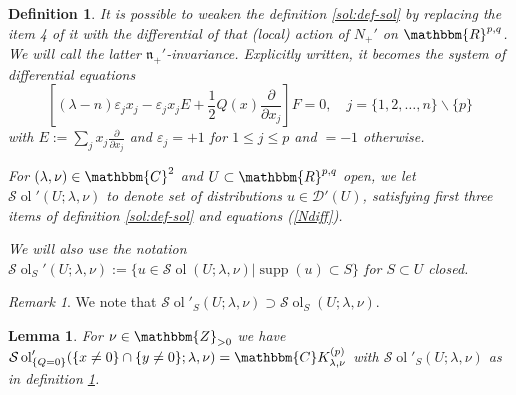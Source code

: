 \documentclass{article}
\newcommand{\assign}{:=}
\newcommand{\tmop}[1]{\ensuremath{\operatorname{#1}}}
\newtheorem{definition}[proposition]{Definition}
\newtheorem{lemma}[proposition]{Lemma}
\theoremstyle{remark}
\newtheorem{remark}[proposition]{Remark}
\begin{document}
\begin{definition}
  \label{n-nonequiv:def-solprime}It is possible to weaken the definition
  \ref{sol:def-sol} by replacing the item 4 of it with the differential of
  that (local) action of $N_+'$ on $\mathbbm{R}^{p, q}$. We will call the
  latter $\mathfrak{n}_+'$-invariance. Explicitly written, it becomes the
  system of differential equations
  \begin{equation}
    \left[ (\lambda - n) \varepsilon_j x_j - \varepsilon_j x_j E + \frac{1}{2}
    Q (x) \frac{\partial}{\partial x_j} \right] F = 0, \quad j = \{ 1, 2,
    \ldots, n \} \backslash \{ p \} \label{Ndiff}
  \end{equation}
  with $E \assign \sum_j x_j  \frac{\partial}{\partial x_j}$ and
  $\varepsilon_j = + 1$ for $1 \leq j \leq p$ and $= - 1$ otherwise.
  
  For $(\lambda, \nu) \in \mathbbm{C}^2$ and $U \subset \mathbbm{R}^{p, q}$
  open, we let $\mathcal{S} \tmop{ol}' (U ; \lambda, \nu)$ to denote set of
  distributions $u \in \mathcal{D}' (U)$, satisfying first three items of
  definition \ref{sol:def-sol} and equations (\ref{Ndiff}).
  
  We will also use the notation $\mathcal{S} \tmop{ol}_S' (U ; \lambda, \nu)
  \assign \{ u \in \mathcal{S} \tmop{ol} (U ; \lambda, \nu) | \tmop{supp} (u)
  \subset S \}$ for $S \subset U$ closed.
\end{definition}

\begin{remark}
  We note that $\mathcal{S} \tmop{ol}'_S (U ; \lambda, \nu) \supset
  \mathcal{S} \tmop{ol}_S (U ; \lambda, \nu)$.
\end{remark}

\begin{lemma}
  \label{lem:sing-q-6}For $\nu \in \mathbbm{Z}_{> 0}$ we have $\mathcal{S}
  \tmop{ol}_{\{ Q = 0 \}}' (\{ x \neq 0 \} \cap \{ y \neq 0 \} ; \lambda, \nu)
  =\mathbbm{C}K^{(p)}_{\lambda, \nu}$ with $\mathcal{S} \tmop{ol}'_S (U ;
  \lambda, \nu)$ as in definition \ref{n-nonequiv:def-solprime}.
\end{lemma}
\end{document}

